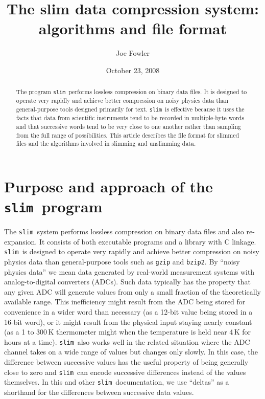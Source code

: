 \documentclass[11pt]{article}
\newcommand{\slim}{{\tt slim}}
\begin{document}
\title{The slim data compression system: 
algorithms and file format}
\author{Joe Fowler}
\date{October 23, 2008}
\maketitle

\begin{abstract}
The program \slim\ performs lossless compression on binary data files.
It is designed to operate very rapidly and achieve better compression
on noisy physics data than general-purpose tools designed primarily
for text.  \slim\ is effective because it uses the facts that data
from scientific instruments tend to be recorded in multiple-byte words
and that successive words tend to be very close to one another rather
than sampling from the full range of possibilities.  This article
describes the file format for slimmed files and the algorithms
involved in slimming and unslimming data.
\end{abstract}

\section{Purpose and approach of the \slim\ program}

The \slim\ system performs lossless compression on binary data files
and also re-expansion.  It consists of both executable programs and a
library with C linkage.  \slim\ is designed to operate very rapidly
and achieve better compression on noisy physics data than
general-purpose tools such as {\tt gzip} and {\tt bzip2}.  By ``noisy
physics data'' we mean data generated by real-world measurement
systems with analog-to-digital converters (ADCs).  Such data typically
has the property that any given ADC will generate values from only a
small fraction of the theoretically available range.  This
inefficiency might result from the ADC being stored for convenience in
a wider word than necessary (as a 12-bit value being stored in a
16-bit word), or it might result from the physical input staying
nearly constant (as a 1 to 300\,K thermometer might when the
temperature is held near 4\,K for hours at a time).  \slim\ also works
well in the related situation where the ADC channel takes on a wide
range of values but changes only slowly.  In this case, the difference
between successive values has the useful property of being generally
close to zero and \slim\ can encode successive differences instead of
the values themselves.  In this and other \slim\ documentation, we
use ``deltas'' as a shorthand for the differences between successive
data values.
\end{document}
